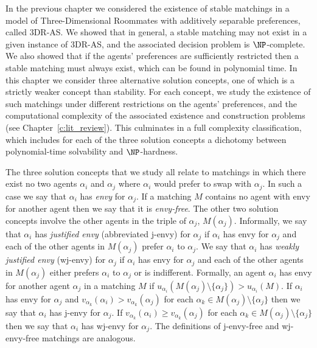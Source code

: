In the previous chapter we considered the existence of stable matchings in a model of Three-Dimensional Roommates with additively separable preferences, called 3DR-AS. We showed that in general, a stable matching may not exist in a given instance of 3DR-AS, and the associated decision problem is $\NP$-complete. We also showed that if the agents' preferences are sufficiently restricted then a stable matching must always exist, which can be found in polynomial time. In this chapter we consider three alternative solution concepts, one of which is a strictly weaker concept than stability. For each concept, we study the existence of such matchings under different restrictions on the agents' preferences, and the computational complexity of the associated existence and construction problems (see Chapter~\ref{c:lit_review}). This culminates in a full complexity classification, which includes for each of the three solution concepts a dichotomy between polynomial-time solvability and $\NP$-hardness.

The three solution concepts that we study all relate to matchings in which there exist no two agents $\alpha_i$ and $\alpha_j$ where $\alpha_i$ would prefer to swap with $\alpha_j$. In such a case we say that $\alpha_i$ has \emph{envy} for $\alpha_j$. If a matching $M$ contains no agent with envy for another agent then we say that it is \emph{envy-free}. The other two solution concepts involve the other agents in the triple of $\alpha_j$, $M(\alpha_j)$. Informally, we say that $\alpha_i$ has \emph{justified envy} (abbreviated j-envy) for $\alpha_j$ if $\alpha_i$ has envy for $\alpha_j$ and each of the other agents in $M(\alpha_j)$ prefer $\alpha_i$ to $\alpha_j$. We say that $\alpha_i$ has \emph{weakly justified envy} (wj-envy) for $\alpha_j$ if $\alpha_i$ has envy for $\alpha_j$ and each of the other agents in $M(\alpha_j)$ either prefers $\alpha_i$ to $\alpha_j$ or is indifferent. Formally, an agent $\alpha_i$ has envy for another agent $\alpha_j$ in a matching $M$ if $u_{\alpha_i}(M(\alpha_j) \setminus \{ \alpha_j \}) > u_{\alpha_i}(M)$. If $\alpha_i$ has envy for $\alpha_j$ and $v_{\alpha_k}(\alpha_i) > v_{\alpha_k}(\alpha_j)$ for each $\alpha_k \in M(\alpha_j) \setminus \{ \alpha_j \}$ then we say that $\alpha_i$ has j-envy for $\alpha_j$. If $v_{\alpha_k}(\alpha_i) \geq v_{\alpha_k}(\alpha_j)$ for each $\alpha_k \in M(\alpha_j) \setminus \{ \alpha_j \}$ then we say that $\alpha_i$ has wj-envy for $\alpha_j$. The definitions of j-envy-free and wj-envy-free matchings are analogous.

